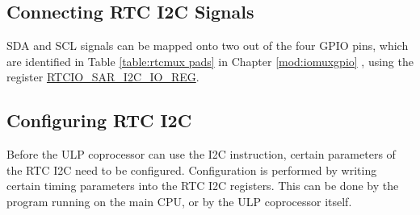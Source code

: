 \documentclass[main\_\_EN.tex]{subfiles}
\begin{document}
\subsection{Connecting RTC I2C Signals}

SDA and SCL signals can be mapped onto two out of the four GPIO pins, which are identified in Table \ref{table:rtcmux pads} in Chapter \ref{mod:iomuxgpio} \textit{}, using the register \hyperref[regdesc:RTCIOSARI2CIOREG]{RTCIO\_SAR\_I2C\_IO\_REG}.


\subsection{Configuring RTC I2C}

Before the ULP coprocessor can use the I2C instruction, certain parameters of the RTC I2C need to be configured. Configuration is performed by writing certain timing parameters into the RTC I2C registers. This can be done by the program running on the main CPU, or by the ULP coprocessor itself.
\end{document}
